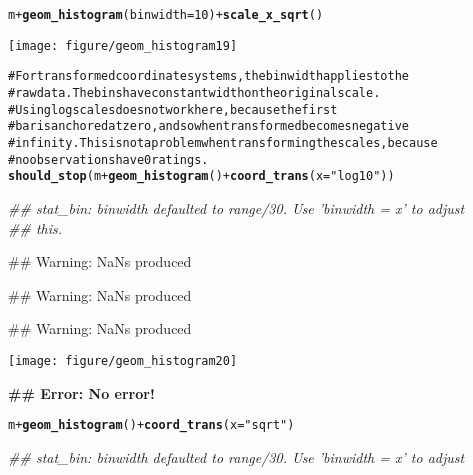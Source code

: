 \documentclass[a4paper,titlepage]{tufte-handout}\usepackage{graphicx, color}
\makeatletter
\def\maxwidth{ %
  \ifdim\Gin@nat@width>\linewidth
    \linewidth
  \else
    \Gin@nat@width
  \fi
}
\newcommand{\hlfunctioncall}[1]{\textcolor[rgb]{0.501960784313725,0,0.329411764705882}{\textbf{#1}}}%
\newcommand{\hlstring}[1]{\textcolor[rgb]{0.6,0.6,1}{#1}}%
\newcommand{\hlcomment}[1]{\textcolor[rgb]{0.180392156862745,0.6,0.341176470588235}{#1}}%
\newenvironment{kframe}{%
 \def\at@end@of@kframe{}%
 \ifinner\ifhmode%
  \def\at@end@of@kframe{\end{minipage}}%
  \begin{minipage}{\columnwidth}%
 \fi\fi%
 \def\FrameCommand##1{\hskip\@totalleftmargin \hskip-\fboxsep
 \colorbox{shadecolor}{##1}\hskip-\fboxsep
     \hskip-\linewidth \hskip-\@totalleftmargin \hskip\columnwidth}%
 \MakeFramed {\advance\hsize-\width
   \@totalleftmargin\z@ \linewidth\hsize
   \@setminipage}}%
 {\par\unskip\endMakeFramed%
 \at@end@of@kframe}
\newenvironment{knitrout}{}{} %
\makeatother
\begin{document}
\begin{knitrout}
\begin{kframe}
\begin{alltt}
m + \hlfunctioncall{geom_histogram}(binwidth = 10) + \hlfunctioncall{scale_x_sqrt}()
\end{alltt}
\end{kframe}\texttt{[image: figure/geom\_histogram19]} \begin{kframe}\begin{alltt}
\hlcomment{# For transformed coordinate systems, the binwidth applies to the}
\hlcomment{# raw data.  The bins have constant width on the original scale.}
\hlcomment{# Using log scales does not work here, because the first}
\hlcomment{# bar is anchored at zero, and so when transformed becomes negative}
\hlcomment{# infinity.  This is not a problem when transforming the scales, because}
\hlcomment{# no observations have 0 ratings.}
\hlfunctioncall{should_stop}(m + \hlfunctioncall{geom_histogram}() + \hlfunctioncall{coord_trans}(x = \hlstring{"log10"}))
\end{alltt}
\begin{flushleft}\ttfamily\noindent\itshape\textcolor{messagecolor}{\#\# stat\_bin: binwidth defaulted to range/30. Use 'binwidth = x' to adjust \\ 
\#\# this.}\end{flushleft}\begin{flushleft}\ttfamily\noindent\textcolor{warningcolor}{\#\# Warning: NaNs produced}\end{flushleft}\begin{flushleft}\ttfamily\noindent\textcolor{warningcolor}{\#\# Warning: NaNs produced}\end{flushleft}\begin{flushleft}\ttfamily\noindent\textcolor{warningcolor}{\#\# Warning: NaNs produced}\end{flushleft}\end{kframe}\texttt{[image: figure/geom\_histogram20]} \begin{kframe}\begin{flushleft}\ttfamily\noindent\bfseries\textcolor{errorcolor}{\#\# Error: No error!}\end{flushleft}\begin{alltt}
m + \hlfunctioncall{geom_histogram}() + \hlfunctioncall{coord_trans}(x = \hlstring{"sqrt"})
\end{alltt}
\begin{flushleft}\ttfamily\noindent\itshape\textcolor{messagecolor}{\#\# stat\_bin: binwidth defaulted to range/30. Use 'binwidth = x' to adjust \\ 
}
\end{flushleft}
\end{kframe}
\end{knitrout}
\end{document}
